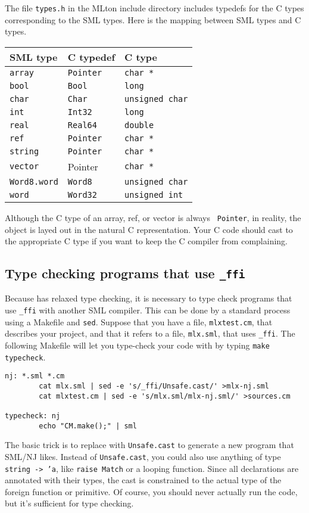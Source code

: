 The file {\tt types.h} in the MLton include directory includes
typedefs for the C types corresponding to the SML types.
Here is the mapping between SML types and C types.

\begin{center}
\begin{tabular}{lll}
SML type & C typedef & C type\\
\hline
{\tt array} & {\tt Pointer} & {\tt char *} \\
{\tt bool} & {\tt Bool} & {\tt long} \\
{\tt char} & {\tt Char} & {\tt unsigned char} \\
{\tt int} & {\tt Int32} & {\tt long} \\
{\tt real} & {\tt Real64} & {\tt double} \\
{\tt ref} & {\tt Pointer} & {\tt char *} \\
{\tt string} & {\tt Pointer} & {\tt char *} \\
{\tt vector} & Pointer & {\tt char *} \\
{\tt Word8.word} & {\tt Word8} & {\tt unsigned char} \\
{\tt word} & {\tt Word32} & {\tt unsigned int} \\
\end{tabular}
\end{center}

Although the C type of an array, ref, or vector is always {\tt
Pointer}, in reality, the object is layed out in the natural C
representation.  Your C code should cast to the appropriate C type if
you want to keep the C compiler from complaining.

\subsection{Type checking programs that use {\tt \_ffi}}

Because {\mlton} has relaxed type checking, it is necessary to
type check programs that use {\tt \_ffi} with another SML compiler.
This can be done by a standard process using a Makefile and {\tt sed}.
Suppose that you have a file, {\tt mlxtest.cm}, that describes your
{\mlton} project, and that it refers to a file, {\tt mlx.sml}, that
uses {\tt \_ffi}.  The following Makefile will let you type-check your
code with {\smlnj} by typing {\tt make typecheck}.

\begin{verbatim}
nj: *.sml *.cm
        cat mlx.sml | sed -e 's/_ffi/Unsafe.cast/' >mlx-nj.sml
        cat mlxtest.cm | sed -e 's/mlx.sml/mlx-nj.sml/' >sources.cm

typecheck: nj
        echo "CM.make();" | sml
\end{verbatim}

The basic trick is to replace {\ffi} with {\tt Unsafe.cast} to generate a new
program that SML/NJ likes.  Instead of {\tt Unsafe.cast}, you could also use
anything of type {\tt string -> 'a}, like {\tt raise Match} or a looping
function.  Since all {\ffi} declarations are annotated with their types, the
cast is constrained to the actual type of the foreign function or primitive. Of
course, you should never actually run the code, but it's sufficient for type
checking.
